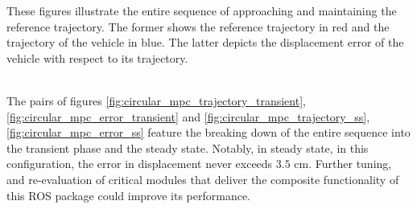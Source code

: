These figures illustrate the entire sequence of approaching and maintaining
the reference trajectory. The former shows the reference trajectory in red
and the trajectory of the vehicle in blue. The latter depicts the displacement
error of the vehicle with respect to its trajectory.

\noindent{}\\

The pairs of figures \ref{fig:circular_mpc_trajectory_transient}, \ref{fig:circular_mpc_error_transient}
and \ref{fig:circular_mpc_trajectory_ss}, \ref{fig:circular_mpc_error_ss}
feature the breaking down of the entire sequence into the transient phase
and the steady state. Notably, in steady state, in this configuration, the
error in displacement never exceeds $3.5$ cm. Further tuning, and re-evaluation
of critical modules that deliver the composite functionality of this ROS
package could improve its performance.


